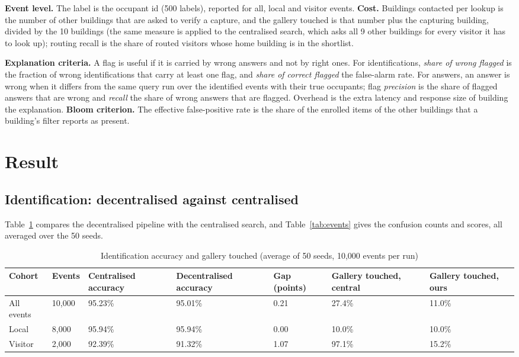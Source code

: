 \documentclass[12pt,a4paper,oneside]{report}
\begin{document}
\textbf{Event level.} The label is the occupant id (500 labels), reported for all, local and visitor events. \textbf{Cost.} Buildings contacted per lookup is the number of other buildings that are asked to verify a capture, and the gallery touched is that number plus the capturing building, divided by the 10 buildings (the same measure is applied to the centralised search, which asks all 9 other buildings for every visitor it has to look up); routing recall is the share of routed visitors whose home building is in the shortlist.

\textbf{Explanation criteria.} A flag is useful if it is carried by wrong answers and not by right ones. For identifications, \emph{share of wrong flagged} is the fraction of wrong identifications that carry at least one flag, and \emph{share of correct flagged} the false-alarm rate. For answers, an answer is wrong when it differs from the same query run over the identified events with their true occupants; flag \emph{precision} is the share of flagged answers that are wrong and \emph{recall} the share of wrong answers that are flagged. Overhead is the extra latency and response size of building the explanation. \textbf{Bloom criterion.} The effective false-positive rate is the share of the enrolled items of the other buildings that a building's filter reports as present.

\section{Result}
\subsection{Identification: decentralised against centralised}\label{sec:res-events}
Table~\ref{tab:central} compares the decentralised pipeline with the centralised search, and Table~\ref{tab:events} gives the confusion counts and scores, all averaged over the 50 seeds.

\begin{table}[htbp]
\centering
\caption{Identification accuracy and gallery touched (average of 50 seeds, 10,000 events per run)}\label{tab:central}
{\small\setlength{\tabcolsep}{4pt}\renewcommand{\arraystretch}{1.2}
\begin{tabular}{|p{2.5cm}|p{1.4cm}|p{2.1cm}|p{2.3cm}|p{1.3cm}|p{1.9cm}|p{1.9cm}|}\hline
\textbf{Cohort} & \textbf{Events} & \textbf{Centralised accuracy} & \textbf{Decentralised accuracy} & \textbf{Gap (points)} & \textbf{Gallery touched, central} & \textbf{Gallery touched, ours}\\\hline
All events & 10,000 & 95.23\% & 95.01\% & 0.21 & 27.4\% & 11.0\%\\\hline
Local & 8,000 & 95.94\% & 95.94\% & 0.00 & 10.0\% & 10.0\%\\\hline
Visitor & 2,000 & 92.39\% & 91.32\% & 1.07 & 97.1\% & 15.2\%\\\hline
\end{tabular}}
\end{table}
\end{document}
